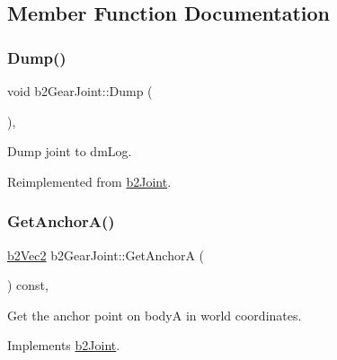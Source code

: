 \subsection{Member Function Documentation}
\mbox{\label{classb2_gear_joint_a40ca34a7853db14d3978c0b18598dd8d}} 
\subsubsection{\texorpdfstring{Dump()}{Dump()}}
{\footnotesize\ttfamily void b2\+Gear\+Joint\+::\+Dump (\begin{DoxyParamCaption}{ }\end{DoxyParamCaption})\hspace{0.3cm}{\ttfamily [override]}, {\ttfamily [virtual]}}



Dump joint to dm\+Log. 



Reimplemented from \mbox{\hyperlink{classb2_joint_abd35e7316017ad9a40d5dbf9b5ba3f36}{b2\+Joint}}.

\mbox{\label{classb2_gear_joint_a2928d2e9eac9137808537faa9b30a649}} 
\subsubsection{\texorpdfstring{GetAnchorA()}{GetAnchorA()}}
{\footnotesize\ttfamily \mbox{\hyperlink{structb2_vec2}{b2\+Vec2}} b2\+Gear\+Joint\+::\+Get\+AnchorA (\begin{DoxyParamCaption}{ }\end{DoxyParamCaption}) const\hspace{0.3cm}{\ttfamily [override]}, {\ttfamily [virtual]}}



Get the anchor point on bodyA in world coordinates. 



Implements \mbox{\hyperlink{classb2_joint_abe46ca3aad5db73909a9b5a7b2117447}{b2\+Joint}}.

\mbox{\label{classb2_gear_joint_a3d24a3265e64f36017404a36abcb7889}} 
